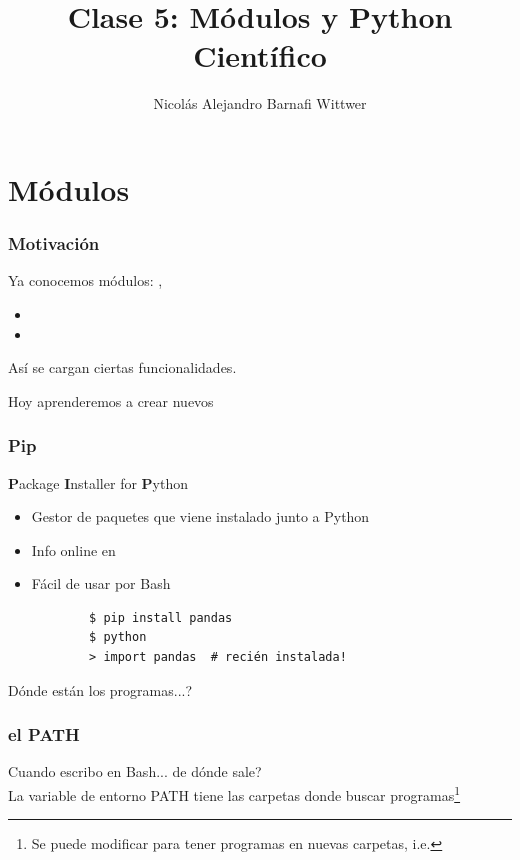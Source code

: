 \documentclass[14pt,aspectratio=169,xcolor=dvipsnames]{beamer}
\title[short title]{Clase 5: Módulos y Python Científico}
\subtitle{}
\author[NA Barnafi] {Nicolás Alejandro Barnafi Wittwer}
\institute[UC|CMM] 
{
    Pontificia Universidad Católica de Chile \\
    Centro de Modelamiento Matemático
}
\date{}
\begin{document}
\begin{frame}
    \maketitle
\end{frame}
\section{Módulos}
\begin{frame}[fragile]\frametitle{Motivación}
    Ya conocemos módulos: , 
    \begin{itemize}
        \item {}
        \item {}
    \end{itemize}
    Así se cargan ciertas funcionalidades. 

    \pause Hoy aprenderemos a crear nuevos
\end{frame}
\begin{frame}[fragile]\frametitle{Pip}
    \textbf{P}ackage \textbf{I}nstaller for \textbf{P}ython
    
    \begin{itemize}
        \item Gestor de paquetes que viene instalado junto a Python
        \item Info online en 
        \item Fácil de usar por Bash
            \begin{verbatim}
        $ pip install pandas
        $ python
        > import pandas  # recién instalada!
            \end{verbatim}
    \end{itemize}
    
    \pause Dónde están los programas...?
\end{frame}
\begin{frame}\frametitle{el PATH}
    Cuando escribo  en Bash... de dónde sale? \\

    \vspace{0.5cm}
    La variable de entorno PATH tiene las carpetas donde buscar programas\footnote{Se puede modificar para tener programas en nuevas carpetas, i.e. }

    \pause {}

    
\end{frame}
\end{document}
